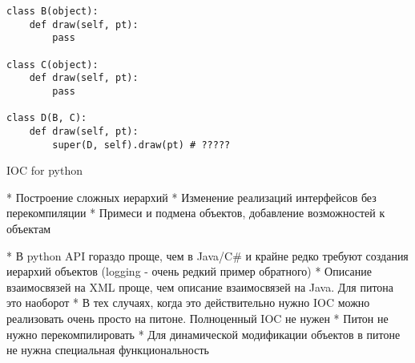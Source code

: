 \documentclass{article}
\begin{document}

\begin{lstlisting}
class B(object):
    def draw(self, pt):
        pass

class C(object):
    def draw(self, pt):
        pass

class D(B, C):
    def draw(self, pt):
        super(D, self).draw(pt) # ?????
\end{lstlisting}
\newpage

IOC for python

* Построение сложных иерархий
* Изменение реализаций интерфейсов без перекомпиляции
* Примеси и подмена объектов, добавление возможностей к объектам

* В python API гораздо проще, чем в Java/C# и крайне редко требуют
  создания иерархий объектов (logging - очень редкий пример обратного)
* Описание взаимосвязей на XML проще, чем описание взаимосвязей на 
  Java. Для питона это наоборот
* В тех случаях, когда это действительно нужно IOC можно реализовать
  очень просто на питоне. Полноценный IOC не нужен
* Питон не нужно перекомпилировать
* Для динамической модификации объектов в питоне не нужна специальная
  функциональность

\end{document}
